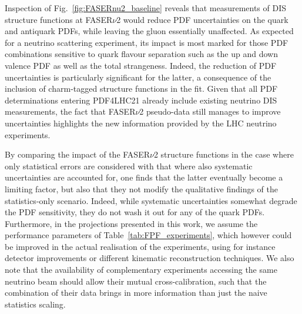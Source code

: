Inspection of Fig.~\ref{fig:FASERnu2_baseline} reveals that measurements of DIS structure
functions at FASER$\nu$2 would reduce PDF uncertainties on the quark and antiquark
PDFs, while leaving
the gluon essentially unaffected.
%
As expected for a neutrino scattering experiment, its impact is most marked for
those PDF combinations sensitive to quark flavour separation such as
the up and down valence PDF as well as the total strangeness.
%
Indeed, the reduction of PDF uncertainties is particularly significant for the latter,
a consequence of the inclusion of charm-tagged structure functions in the fit.
%
Given that all PDF determinations entering PDF4LHC21 already include existing neutrino
DIS measurements, the fact that FASER$\nu$2 pseudo-data still manages to improve
uncertainties highlights the new information provided by the LHC neutrino experiments.

By comparing the impact of the FASER$\nu$2 structure functions
in the case where only statistical errors are considered with that
where also systematic uncertainties are accounted for,
one finds that the latter eventually become a limiting factor,
but also that they not modify the qualitative findings of the statistics-only scenario.
%
Indeed, while systematic uncertainties somewhat degrade the PDF sensitivity,
they do not wash it out for any of the quark PDFs.
%
Furthermore, in the projections presented in this work,
we assume the performance parameters of  Table~\ref{tab:FPF_experiments}, which
however could be improved in the actual realisation of the experiments,
using for instance detector improvements or different kinematic reconstruction techniques.
%
We also note that the availability of complementary experiments accessing the same neutrino
beam should allow their mutual cross-calibration, such that the combination of their
data brings in more information than just the naive statistics scaling.

